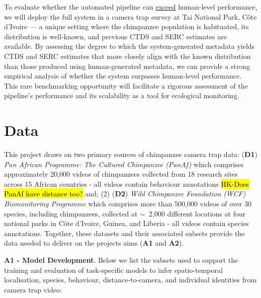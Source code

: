 \documentclass{article}
\begin{document}
\begin{enumerate}[label=\textbf{WS\arabic*:}]
            To evaluate whether the automated pipeline can \underline{exceed} human-level performance, we will deploy the full system in a camera trap survey at Tai National Park, Côte d’Ivoire — a unique setting where the chimpanzee population is habituated, its distribution is well-known, and previous CTDS and SERC estimates are available. By assessing the degree to which the system-generated metadata yields CTDS and SERC estimates that more closely align with the known distribution than those produced using human-generated metadata, we can provide a strong empirical analysis of whether the system surpasses human-level performance. This rare benchmarking opportunity will facilitate a rigorous assessment of the pipeline’s performance and its scalability as a tool for ecological monitoring.

\end{enumerate}

\section{Data}

This project draws on two primary sources of chimpanzee camera trap data: (\textbf{D1}) \textit{Pan African Programme: The Cultured Chimpanzee (PanAf)} which comprises approximately 20,000 videos of chimpanzees collected from 18 research sites across 15 African countries - all videos contain behaviour annotations \hl{HK-Does PanAf have distance too?}%
and; (2) (\textbf{D2}) \textit{Wild Chimpanzee Foundation (WCF) Biomonitoring Programme} which comprises more than 500,000 videos of over 30 species, including chimpanzees, collected at $\sim$~2,000 different locations at four national parks in Côte d’Ivoire, Guinea, and Liberia - all videos contain species annotations. %
Together, these datasets and their associated subsets provide the data needed to deliver on the projects aims (\textbf{A1} and \textbf{A2}).

\textbf{A1 - Model Development}. Below we list the subsets used to support the training and evaluation of task-specific models to infer spatio-temporal localisation, species, behaviour, distance-to-camera, and individual identities from camera trap video:
\end{document}
